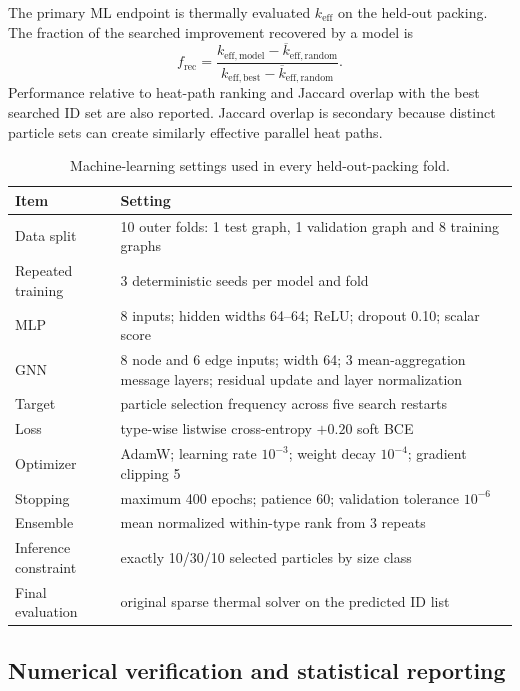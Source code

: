 \documentclass[12pt,a4paper]{article}
\begin{document}
	The primary ML endpoint is thermally evaluated $k_{\mathrm{eff}}$ on the
	held-out packing. The fraction of the searched improvement recovered by a model
	is
	\begin{equation}
		f_{\mathrm{rec}}=
		\frac{k_{\mathrm{eff,model}}-\overline{k}_{\mathrm{eff,random}}}
		{k_{\mathrm{eff,best}}-\overline{k}_{\mathrm{eff,random}}}.
		\label{eq:recovered}
	\end{equation}
	Performance relative to heat-path ranking and Jaccard overlap with the best
	searched ID set are also reported. Jaccard overlap is secondary because distinct
	particle sets can create similarly effective parallel heat paths.

	\begin{table}[!htbp]
		\centering
		\caption{Machine-learning settings used in every held-out-packing fold.}
		\label{tab:mlsettings}
		\small
		\begin{tabular}{P{4.7cm}P{7.2cm}}
			\toprule
			\textbf{Item} & \textbf{Setting} \\
			\midrule
			Data split & 10 outer folds: 1 test graph, 1 validation graph and 8 training graphs \\
			Repeated training & 3 deterministic seeds per model and fold \\
			MLP & 8 inputs; hidden widths 64--64; ReLU; dropout 0.10; scalar score \\
			GNN & 8 node and 6 edge inputs; width 64; 3 mean-aggregation message layers; residual update and layer normalization \\
			Target & particle selection frequency across five search restarts \\
			Loss & type-wise listwise cross-entropy $+0.20$ soft BCE \\
			Optimizer & AdamW; learning rate $10^{-3}$; weight decay $10^{-4}$; gradient clipping 5 \\
			Stopping & maximum 400 epochs; patience 60; validation tolerance $10^{-6}$ \\
			Ensemble & mean normalized within-type rank from 3 repeats \\
			Inference constraint & exactly 10/30/10 selected particles by size class \\
			Final evaluation & original sparse thermal solver on the predicted ID list \\
			\bottomrule
		\end{tabular}
	\end{table}

	\subsection{Numerical verification and statistical reporting}
	
\end{document}
